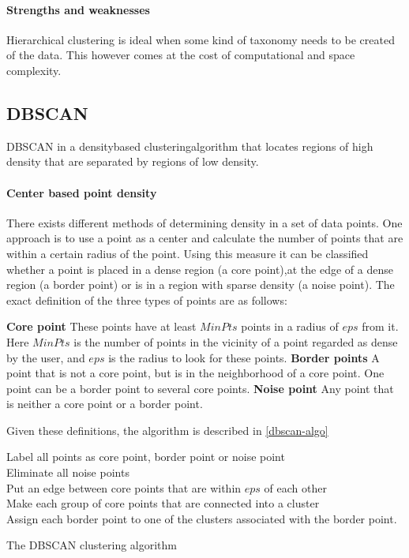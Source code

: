 \paragraph{Strengths and weaknesses}
Hierarchical clustering is ideal when some kind of taxonomy needs to be created of the data.
This however comes at the cost of computational and space complexity.

\subsection{DBSCAN}
DBSCAN in a densitybased clusteringalgorithm that locates regions of high density that are separated by regions of low density.

\paragraph{Center based point density}
There exists different methods of determining density in a set of data points.
One approach is to use a point as a center and calculate the number of points that are within a certain radius of the point.
Using this measure it can be classified whether a point is placed in a dense region (a core point),at the edge of a dense region (a border point) or is in a region with sparse density (a noise point).
The exact definition of the three types of points are as follows:\cite{pang2006introduction}

\textbf{Core point} These points have at least $ MinPts $ points in a radius of $ eps $ from it. 
Here $ MinPts $ is the number of points in the vicinity of a point regarded as dense by the user, and $ eps $ is the radius to look for these points.
\textbf{Border points} A point that is not a core point, but is in the neighborhood of a core point. 
One point can be a border point to several core points.
\textbf{Noise point} Any point that is neither a core point or a border point. 

Given these definitions, the algorithm is described in \cref{dbscan-algo}

\begin{algorithm}
Label all points as core point, border point or noise point \\
Eliminate all noise points \\
Put an edge between core points that are within $ eps $ of each other \\
Make each group of core points that are connected into a cluster \\
Assign each border point to one of the clusters associated with the border point. 
\caption{The DBSCAN clustering algorithm}\label{dbscan-algo}
\end{algorithm}

